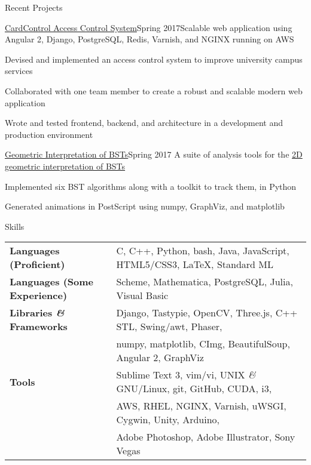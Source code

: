 \documentclass{resume}
\begin{document}
  \begin{rSection}{Recent Projects}
    \begin{rSubsection}{\href{https://github.com/CaerusKaru/cardcontrol}{CardControl Access Control System}}{Spring 2017}{Scalable web application using Angular 2, Django, PostgreSQL, Redis, Varnish, and NGINX running on AWS}{}
    \item Devised and implemented an access control system to improve university campus services
    \item Collaborated with one team member to create a robust and scalable modern web application
    \item Wrote and tested frontend, backend, and architecture in a development and production environment
    \end{rSubsection}
    
    \begin{rSubsection}{\href{https://github.com/forsooth/BST-analysis}{Geometric Interpretation of BSTs}}{Spring 2017}
    {A suite of analysis tools for the \href{https://en.wikipedia.org/wiki/Geometry_of_binary_search_trees}{2D geometric interpretation of BSTs}} {}
    \item Implemented six BST algorithms along with a toolkit to track them, in Python
    \item Generated animations in PostScript using numpy, GraphViz, and matplotlib
    \end{rSubsection}
  
  \end{rSection}
  
  \begin{rSection}{Skills}
    \begin{tabular}{ @{} >{\bfseries}l @{\hspace{6ex}} l }
      Languages (Proficient)& C, C++, Python, bash, Java, JavaScript, HTML5/CSS3, \LaTeX, Standard ML\\
      Languages (Some Experience)& Scheme, Mathematica, PostgreSQL, Julia, Visual Basic\\
      Libraries \textit{\&} Frameworks & Django, Tastypie, OpenCV, Three.js, C++ STL, Swing/awt, Phaser,\\
      & numpy, matplotlib, CImg, BeautifulSoup, Angular 2, GraphViz\\
      Tools & Sublime Text 3, vim/vi, UNIX \textit{\&} GNU/Linux, git, GitHub, CUDA, i3,\\
      & AWS, RHEL, NGINX, Varnish, uWSGI, Cygwin, Unity, Arduino,\\
      & Adobe Photoshop, Adobe Illustrator, Sony Vegas
    \end{tabular}
  \end{rSection}
\end{document}

